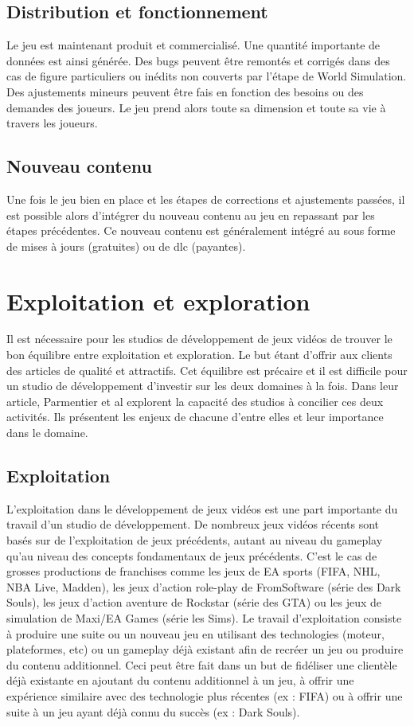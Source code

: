 \subsection{Distribution et fonctionnement}
Le jeu est maintenant produit et commercialisé. Une quantité importante de données est ainsi générée. Des bugs peuvent être remontés et corrigés dans des cas de figure particuliers ou inédits non couverts par l'étape de World Simulation. Des ajustements mineurs peuvent être fais en fonction des besoins ou des demandes des joueurs. Le jeu prend alors toute sa dimension et toute sa vie à travers les joueurs.

\subsection{Nouveau contenu}
Une fois le jeu bien en place et les étapes de corrections et ajustements passées, il est possible alors d'intégrer du nouveau contenu au jeu en repassant par les étapes précédentes. Ce nouveau contenu est généralement intégré au sous forme de mises à jours (gratuites) ou de \gls{dlc} (payantes).



\section{Exploitation et exploration}
Il est nécessaire pour les studios de développement de jeux vidéos de trouver le bon équilibre entre exploitation et exploration. Le but étant d'offrir aux clients des articles de qualité et attractifs. Cet équilibre est précaire et il est difficile pour un studio de développement d'investir sur les deux domaines à la fois. Dans leur article, Parmentier et al \cite{ParmentierGuy2009Iecd} explorent la capacité des studios à concilier ces deux activités. Ils présentent les enjeux de chacune d'entre elles et leur importance dans le domaine.

\subsection{Exploitation}
L'exploitation dans le développement de jeux vidéos est une part importante du travail d'un studio de développement. De nombreux jeux vidéos récents sont basés sur de l'exploitation de jeux précédents, autant au niveau du gameplay qu'au niveau des concepts fondamentaux de jeux précédents. C'est le cas de grosses productions de franchises comme les jeux de EA sports (FIFA, NHL, NBA Live, Madden), les jeux d'action role-play de FromSoftware (série des Dark Souls), les jeux d'action aventure de Rockstar (série des GTA) ou les jeux de simulation de Maxi/EA Games (série les Sims). Le travail d'exploitation consiste à produire une suite ou un nouveau jeu en utilisant des technologies (moteur, plateformes, etc) ou un gameplay déjà existant afin de recréer un jeu ou produire du contenu additionnel. Ceci peut être fait dans un but de fidéliser une clientèle déjà existante en ajoutant du contenu additionnel à un jeu, à offrir une expérience similaire avec des technologie plus récentes (ex : FIFA) ou à offrir une suite à un jeu ayant déjà connu du succès (ex : Dark Souls).

